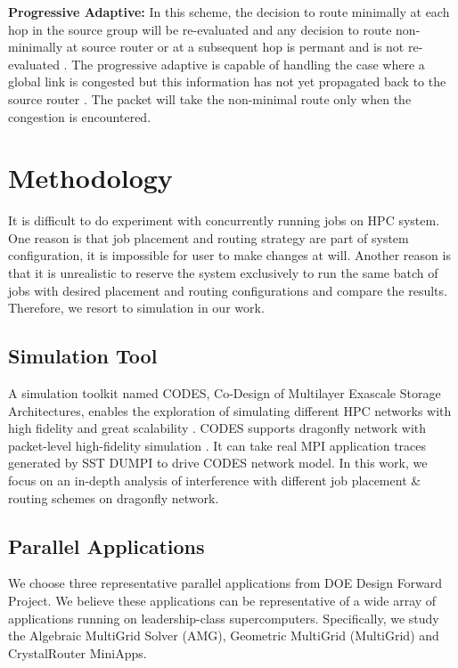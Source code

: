 \documentclass[conference,compsoc]{IEEEtran}
\begin{document}
\textbf{Progressive Adaptive:} In this scheme, the decision to route minimally at each hop in the source group will be re-evaluated and any decision to route non-minimally at source router or at a subsequent hop is permant and is not re-evaluated \cite{jiang}. The progressive adaptive is capable of handling the case where a global link is congested but this information has not yet propagated back to the source router \cite{jiang}. The packet will take the non-minimal route only when the congestion is encountered. 



\section{Methodology}
\label{sec: methodology}

It is difficult to do experiment with concurrently running jobs on HPC system. One reason is that job placement and routing strategy are part of system configuration, it is impossible for user to make changes at will. Another reason is that it is unrealistic to reserve the system exclusively to run the same batch of jobs with desired placement and routing configurations and compare the results. Therefore, we resort to simulation in our work. 

\subsection{Simulation Tool}
\label{sec:simulation-tool}
A simulation toolkit named CODES, Co-Design of Multilayer Exascale Storage Architectures, enables the exploration of simulating different HPC networks with high fidelity and great scalability \cite{codes}. CODES supports dragonfly network with packet-level high-fidelity simulation\cite{codes-dragonfly} \cite{misbah-tpds}. It can take real MPI application traces generated by SST DUMPI\cite{sst} to drive CODES network model. In this work, we focus on an in-depth analysis of interference  with different job placement \& routing schemes on dragonfly network.

\subsection{Parallel Applications}
\label{sec: application traces}

We choose three representative parallel applications from DOE Design Forward Project\cite{designforwardwebpage}. We believe these applications can be representative of a wide array of applications running on leadership-class supercomputers. Specifically, we study the Algebraic MultiGrid Solver (AMG), Geometric MultiGrid (MultiGrid) and CrystalRouter MiniApps. 
\end{document}
